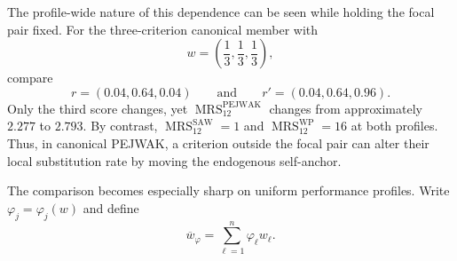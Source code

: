 \documentclass[reqno,11pt]{amsart}
\theoremstyle{definition}
\theoremstyle{plain}
\theoremstyle{remark}
\begin{document}
The profile-wide nature of this dependence can be seen while holding the
focal pair fixed. For the three-criterion canonical member with
\[
w=\left(\frac13,\frac13,\frac13\right),
\]
compare
\[
r=(0.04,0.64,0.04)
\qquad\text{and}\qquad
r'=(0.04,0.64,0.96).
\]
Only the third score changes, yet
$\operatorname{MRS}_{12}^{\mathrm{PEJWAK}}$ changes from approximately
$2.277$ to $2.793$. By contrast,
$\operatorname{MRS}_{12}^{\mathrm{SAW}}=1$ and
$\operatorname{MRS}_{12}^{\mathrm{WP}}=16$ at both profiles. Thus, in
canonical PEJWAK, a criterion outside the focal pair can alter their
local substitution rate by moving the endogenous self-anchor.

The comparison becomes especially sharp on uniform performance
profiles. Write $\varphi_j=\varphi_j(w)$ and define
\[
\overline w_\varphi
=
\sum_{\ell=1}^{n}\varphi_\ell w_\ell.
\]
\end{document}
